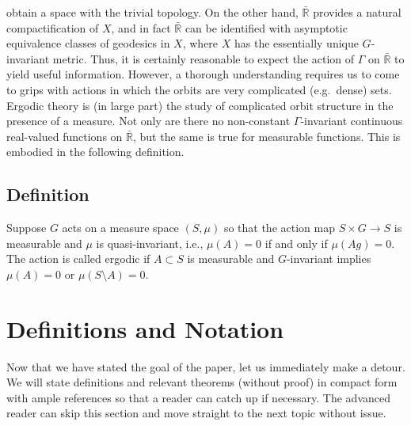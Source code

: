 \documentclass[
]{article}
\theoremstyle{break}
\theoremstyle{plain}
\begin{document}
obtain a space with the trivial topology. On the other hand,
$\bar{\mathbb{R}}$ provides a natural compactification of $X$, and
in fact $\bar{\mathbb{R}}$ can be identified with asymptotic
equivalence classes of geodesics in $X$, where $X$ has the
essentially unique $G$-invariant metric. Thus, it is certainly
reasonable to expect the action of $\Gamma$ on $\bar{\mathbb{R}}$ to
yield useful information. However, a thorough understanding requires us
to come to grips with actions in which the orbits are very complicated
(e.g.~dense) sets. Ergodic theory is (in large part) the study of
complicated orbit structure in the presence of a measure. Not only are
there no non-constant $\Gamma$-invariant continuous real-valued
functions on $\bar{\mathbb{R}}$, but the same is true for measurable
functions. This is embodied in the following definition.

\hypertarget{definition}{%
\subsection{Definition}\label{definition}}

Suppose $G$ acts on a measure space $(S, \mu)$ so that the action
map $S \times G \rightarrow S$ is measurable and $\mu$ is
quasi-invariant, i.e., $\mu(A) = 0$ if and only if $\mu(Ag) = 0$.
The action is called ergodic if $A \subset S$ is measurable and
$G$-invariant implies $\mu(A) = 0$ or $\mu(S\setminus A) = 0$.







\hypertarget{definitions-and-notation}{%
\section{Definitions and Notation}\label{definitions-and-notation}}

Now that we have stated the goal of the paper, let us immediately make a
detour. We will state definitions and relevant theorems (without proof)
in compact form with ample references so that a reader can catch up if
necessary. The advanced reader can skip this section and move straight
to the next topic without issue.

\end{document}
